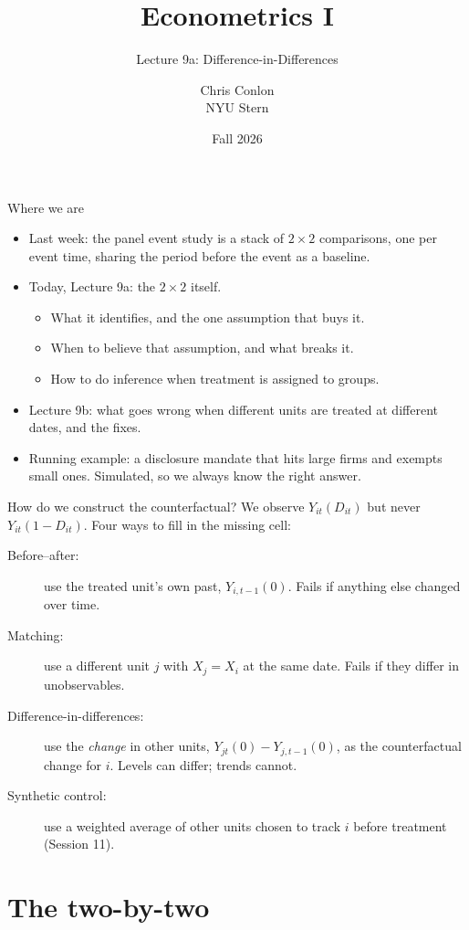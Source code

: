 \documentclass[aspectratio=169,11pt]{beamer}
\title[L9a - DiD]{ Econometrics I}
\subtitle{Lecture 9a: Difference-in-Differences}
\author{Chris Conlon \\NYU Stern}
\date{Fall 2026}
\begin{document}
\frame{\titlepage}


\begin{frame}{Where we are}
\begin{itemize}
	\item Last week: the panel event study is a \alert{stack of $2\times2$ comparisons}, one per event time,
	sharing the period before the event as a baseline.
	\medskip
	\item Today, Lecture 9a: the $2\times2$ itself.
	\begin{itemize}
		\item What it identifies, and the one assumption that buys it.
		\item When to believe that assumption, and what breaks it.
		\item How to do inference when treatment is assigned to groups.
	\end{itemize}
	\medskip
	\item Lecture 9b: what goes wrong when different units are treated at different dates, and the fixes.
	\medskip
	\item Running example: a disclosure mandate that hits large firms and exempts small ones.
	Simulated, so we always know the right answer.
\end{itemize}
\end{frame}


\begin{frame}{How do we construct the counterfactual?}
We observe $Y_{it}(D_{it})$ but never $Y_{it}(1-D_{it})$. Four ways to fill in the missing cell:
\begin{description}
	\item [Before--after:] use the treated unit's own past, $Y_{i,t-1}(0)$. Fails if anything else changed over time.
	\item [Matching:] use a different unit $j$ with $X_j = X_i$ at the same date. Fails if they differ in
	unobservables.
	\item [\alert{Difference-in-differences:}] use the \emph{change} in other units,
	$Y_{jt}(0) - Y_{j,t-1}(0)$, as the counterfactual change for $i$. Levels can differ; trends cannot.
	\item [Synthetic control:] use a weighted average of other units chosen to track $i$ before
	treatment (Session 11).
\end{description}
\end{frame}


\section{The two-by-two}
\end{document}
